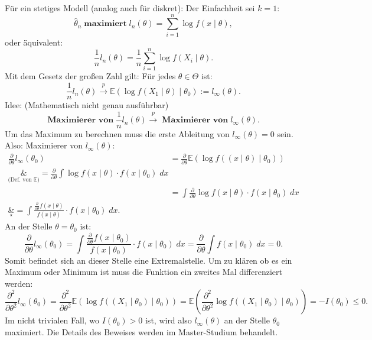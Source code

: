 \documentclass[10pt]{article}
\newcommand{\EW}{\mathbb{E}} %
\newcommand{\KW}{\overset{p} \longrightarrow} %
\newcommand{\xt}{x \mid \theta} %
\newenvironment{BWS}[1][]
{\begin{Beweis}[frametitle=#1]}{\end{Beweis}}
\begin{document}
	\begin{BWS}[Beweisidee 1.3.4 (Konsistenz von ML-Schätzern)]
		Für ein stetiges Modell (analog auch für diskret):
		Der Einfachheit sei $k=1$:
		\begin{equation*}
			\hat{\theta}_n \; \textbf{maximiert} \; l_n(\theta) = \sum_{i=1}^{n}\log f(\xt), 
		\end{equation*}
		oder äquivalent:
		\begin{equation*}
			\frac{1}{n} l_n(\theta) = \frac{1}{n}\sum_{i=1}^{n}\log f(X_i \mid \theta).
		\end{equation*}
		Mit dem Gesetz der großen Zahl gilt:
		Für jedes $\theta \in \Theta$ ist:
		\begin{equation*}
			\frac{1}{n} l_n (\theta) \KW \EW(\log f(X_1 \mid \theta) \mid \theta_0) := l_\infty (\theta).
		\end{equation*}
		Idee: (Mathematisch nicht genau ausführbar)
		\begin{equation*}
			\textbf{Maximierer von} \; \frac{1}{n} l_n(\theta) \KW \; \textbf{Maximierer von} \; l_\infty (\theta).
		\end{equation*}
		Um das Maximum zu berechnen muss die erste Ableitung von $l_\infty (\theta) = 0$ sein. Also: Maximierer von $l_\infty (\theta)$:
		\begin{equation*}
			\begin{split}
				\frac{\partial}{\partial \theta} l_\infty (\theta_0) &= \frac{\partial}{\partial \theta} \EW(\log f((x\mid \theta)\mid \theta_0))\\
				\underset{\text{(Def. von $\EW$)}}&{=} \frac{\partial}{\partial \theta} \int \log f(x \mid \theta) \cdot f(x \mid \theta_0) \; dx \\
				&= \int \frac{\partial}{\partial \theta} \log f(x \mid \theta) \cdot f(x\mid \theta_0) \; dx \\
				\underset{\star}&{=}\int \frac{\frac{\partial}{\partial \theta} f(x\mid \theta)}{f(x\mid \theta)} \cdot f(x\mid \theta_0) \; dx. 
			\end{split}
		\end{equation*}
		An der Stelle $\theta = \theta_0$ ist:
		\begin{equation*}
			\frac{\partial}{\partial \theta} l_\infty (\theta_0) = \int \frac{\frac{\partial}{\partial \theta} f(x\mid\theta_0)}{f(x\mid\theta_0)} \cdot f(x\mid\theta_0) \; dx = \frac{\partial}{\partial \theta} \int f(x\mid\theta_0) \; dx = 0.
		\end{equation*}
		Somit befindet sich an dieser Stelle eine Extremalstelle. Um zu klären ob es ein Maximum oder Minimum ist muss die Funktion ein zweites Mal differenziert werden:
		\begin{equation*}
			\frac{\partial^2}{\partial \theta^2} l_\infty(\theta_0) = \frac{\partial^2}{\partial \theta^2} \EW (\log f((X_1 \mid \theta_0) \mid \theta_0)) = \EW \left(\frac{\partial^2}{\partial \theta^2}\log f\left(\left(X_1 \mid \theta_0\right) \mid \theta_0\right)\right) = - I(\theta_0) \leq 0.
		\end{equation*}
		Im nicht trivialen Fall, wo $I(\theta_0) > 0$ ist, wird also $l_\infty (\theta)$ an der Stelle $\theta_0$ maximiert. Die Details des Beweises werden im Master-Studium behandelt. 
	\end{BWS}
	
\end{document}
